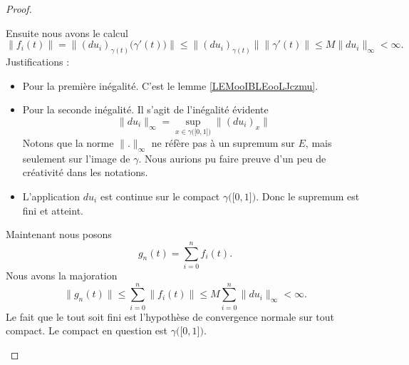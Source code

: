 \begin{proof}
\begin{subproof}
            Ensuite nous avons le calcul
            \begin{equation}
                    \| f_i(t) \|=\| (du_i)_{\gamma(t)}\big( \gamma'(t) \big) \|
                    \leq\| (du_i)_{\gamma(t)} \|\| \gamma'(t) \|  
                    \leq M\| du_i \|_{\infty}<\infty.
            \end{equation}
            Justifications :
            \begin{itemize}
                \item 
                    Pour la première inégalité. C'est le lemme \ref{LEMooIBLEooLJczmu}. 
                \item Pour la seconde inégalité. Il s'agit de l'inégalité évidente
                    \begin{equation}
                        \| du_i \|_{\infty}=\sup_{x\in \gamma\big( \mathopen[ 0 , 1 \mathclose] \big)}\| (du_i)_x \|
                    \end{equation}
                    Notons que la norme \( \| . \|_{\infty}\) ne réfère pas à un supremum sur \( E\), mais seulement sur l'image de \( \gamma\). Nous aurions pu faire preuve d'un peu de créativité dans les notations.
                \item 
                    L'application \( du_i\) est continue sur le compact \( \gamma\big( \mathopen[ 0 , 1 \mathclose] \big)\). Donc le supremum est fini et atteint.
            \end{itemize}

            Maintenant nous posons
            \begin{equation}
                g_n(t)=\sum_{i=0}^nf_i(t).
            \end{equation}
            Nous avons la majoration
            \begin{equation}
                \| g_n(t) \|\leq \sum_{i=0}^n\| f_i(t) \|\leq M\sum_{i=0}^n\| du_i \|_{\infty}<\infty.
            \end{equation}
            Le fait que le tout soit fini est l'hypothèse de convergence normale sur tout compact. Le compact en question est \( \gamma\big( \mathopen[ 0 , 1 \mathclose] \big)\).


\end{subproof}
\end{proof}
